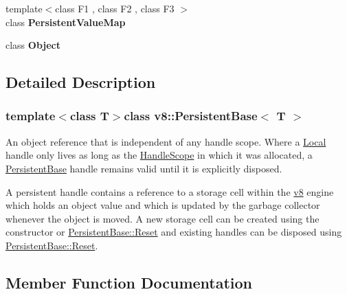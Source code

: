 \begin{DoxyCompactItemize}
\item 
\hypertarget{classv8_1_1_persistent_base_a401e5cd2db49a67497042617f01fdbc2}{}{\footnotesize template$<$class F1 , class F2 , class F3 $>$ }\\class {\bfseries Persistent\+Value\+Map}\label{classv8_1_1_persistent_base_a401e5cd2db49a67497042617f01fdbc2}

\item 
\hypertarget{classv8_1_1_persistent_base_a0720b5f434e636e22a3ed34f847eec57}{}class {\bfseries Object}\label{classv8_1_1_persistent_base_a0720b5f434e636e22a3ed34f847eec57}

\end{DoxyCompactItemize}


\subsection{Detailed Description}
\subsubsection*{template$<$class T$>$class v8\+::\+Persistent\+Base$<$ T $>$}

An object reference that is independent of any handle scope. Where a \hyperlink{classv8_1_1_local}{Local} handle only lives as long as the \hyperlink{classv8_1_1_handle_scope}{Handle\+Scope} in which it was allocated, a \hyperlink{classv8_1_1_persistent_base}{Persistent\+Base} handle remains valid until it is explicitly disposed.

A persistent handle contains a reference to a storage cell within the \hyperlink{namespacev8}{v8} engine which holds an object value and which is updated by the garbage collector whenever the object is moved. A new storage cell can be created using the constructor or \hyperlink{classv8_1_1_persistent_base_a174bb1e45b18fd4eeaee033622825bb8}{Persistent\+Base\+::\+Reset} and existing handles can be disposed using \hyperlink{classv8_1_1_persistent_base_a174bb1e45b18fd4eeaee033622825bb8}{Persistent\+Base\+::\+Reset}. 

\subsection{Member Function Documentation}
\hypertarget{classv8_1_1_persistent_base_a4a64c26d91ed6a276aa8a7ca4bb7683a}{}
